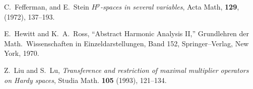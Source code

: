 \begin{thebibliography}{Dillo 83}




    C.\ Fefferman, and E.\ Stein
{\em $H^p$-spaces in several variables},  Acta Math, 
{\bf 129}, (1972), 137--193.







 E.\ Hewitt and K.\ A.\ Ross,
``Abstract Harmonic Analysis II,'' Grundlehren der
Math.\ Wissenschaften in Einzeldarstellungen, Band
152, Springer--Verlag, New York, 1970.


 Z.\ Liu and S.\ Lu,
{\em Transference and restriction of maximal 
multiplier operators on
Hardy spaces}, Studia Math. {\bf 105} (1993), 121--134.




\end{thebibliography}
